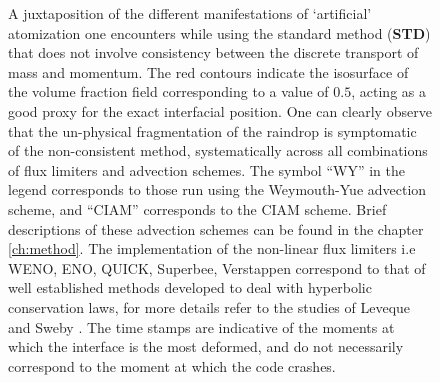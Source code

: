 \begin{figure}
\begin{center}
\end{center}
\vspace*{-0.5cm}
\caption{A juxtaposition of the different manifestations of  
`artificial' atomization one encounters while using the standard 
method (\textbf{STD}) that does not involve consistency between the discrete transport of mass and momentum. 
The red contours indicate the isosurface of the volume fraction 
field corresponding to a value of $0.5$, acting as a good proxy for the exact interfacial position. 
One can clearly observe that the un-physical fragmentation of the raindrop is symptomatic 
of the non-consistent method, systematically across all combinations of flux limiters and advection schemes. 
The symbol ``WY'' in the legend corresponds to those run using 
the Weymouth-Yue advection scheme, and ``CIAM'' corresponds to the CIAM scheme. 
Brief descriptions of these advection schemes can be found in the chapter \ref{ch:method}.
The implementation of the non-linear flux limiters i.e WENO, ENO, QUICK, Superbee, Verstappen 
correspond to that of well established methods developed to 
deal with hyperbolic conservation laws, for more details refer to the
studies of Leveque \cite{flim_1} and Sweby \cite{flim_2}.
The time stamps are indicative of the moments at which the interface
is the most deformed, and do not necessarily correspond to the moment
at which the code crashes.} 
\label{explode_all}
\end{figure}

